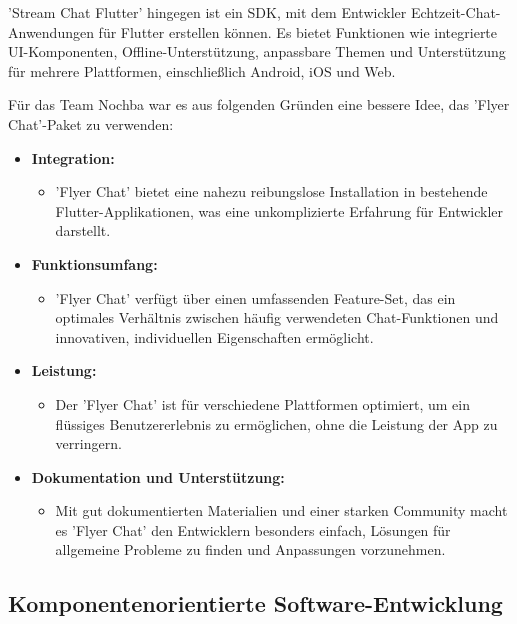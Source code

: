 'Stream Chat Flutter' hingegen ist ein SDK, mit dem Entwickler Echtzeit-Chat-Anwendungen für Flutter erstellen können. Es bietet Funktionen wie integrierte UI-Komponenten, Offline-Unterstützung, anpassbare Themen und Unterstützung für mehrere Plattformen, einschließlich Android, iOS und Web.

Für das Team Nochba war es aus folgenden Gründen eine bessere Idee, das 'Flyer Chat'-Paket zu verwenden:

\begin{itemize}
  \item \textbf{Integration:}
        \begin{itemize}
          \item {'Flyer Chat' bietet eine nahezu reibungslose Installation in bestehende Flutter-Applikationen, was eine unkomplizierte Erfahrung für Entwickler darstellt.}
        \end{itemize}
  \item \textbf{Funktionsumfang:}
        \begin{itemize}
          \item {'Flyer Chat' verfügt über einen umfassenden Feature-Set, das ein optimales Verhältnis zwischen häufig verwendeten Chat-Funktionen und innovativen, individuellen Eigenschaften ermöglicht.}
        \end{itemize}
  \item \textbf{Leistung:}
        \begin{itemize}
          \item {Der 'Flyer Chat' ist für verschiedene Plattformen optimiert, um ein flüssiges Benutzererlebnis zu ermöglichen, ohne die Leistung der App zu verringern.}
        \end{itemize}
  \item \textbf{Dokumentation und Unterstützung:}
        \begin{itemize}
          \item {Mit gut dokumentierten Materialien und einer starken Community macht es 'Flyer Chat' den Entwicklern besonders einfach, Lösungen für allgemeine Probleme zu finden und Anpassungen vorzunehmen.}
        \end{itemize}
\end{itemize}

\subsection{Komponentenorientierte Software-Entwicklung}


